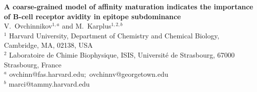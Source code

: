 \begin{center}
\Large \textbf{A coarse-grained model of affinity maturation indicates the importance of
B-cell receptor avidity in epitope subdominance}\\
\large V.~Ovchinnikov$^{1,a}$ and M.~Karplus$^{1,2,b}$\\
\small $^1$ Harvard University, Department of Chemistry and Chemical Biology, Cambridge, MA, 02138, USA \\
\small $^2$ Laboratoire de Chimie Biophysique, ISIS, Universit\'e de Strasbourg, 67000 Strasbourg, France \\
\small $^a$ ovchinn@fas.harvard.edu;\ ovchinnv@georgetown.edu\\
\small $^b$ marci@tammy.harvard.edu\\
\end{center}
